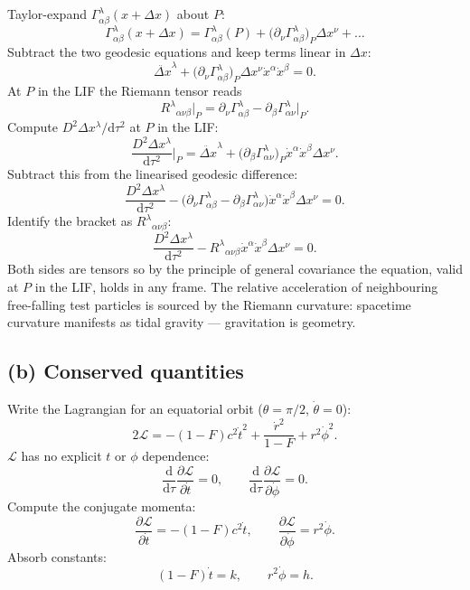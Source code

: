 \documentclass[11pt]{article}
\newcommand{\de}{\mathrm{d}}
\begin{document}
Taylor-expand $\Gamma^{\lambda}_{\alpha\beta}(x+\Delta x)$ about $P$:
\[
\Gamma^{\lambda}_{\alpha\beta}(x+\Delta x)=\Gamma^{\lambda}_{\alpha\beta}(P)+\bigl(\partial_{\nu}\Gamma^{\lambda}_{\alpha\beta}\bigr)_{P}\Delta x^{\nu}+\dots
\]
Subtract the two geodesic equations and keep terms linear in $\Delta x$:
\[
\ddot{\Delta x}^{\lambda}+\bigl(\partial_{\nu}\Gamma^{\lambda}_{\alpha\beta}\bigr)_{P}\Delta x^{\nu}\dot x^{\alpha}\dot x^{\beta}=0.
\]
At $P$ in the LIF the Riemann tensor reads
\[
R^{\lambda}{}_{\alpha\nu\beta}\bigl|_{P}=\partial_{\nu}\Gamma^{\lambda}_{\alpha\beta}-\partial_{\beta}\Gamma^{\lambda}_{\alpha\nu}\bigl|_{P}.
\]
Compute $D^{2}\Delta x^{\lambda}/\de\tau^{2}$ at $P$ in the LIF:
\[
\frac{D^{2}\Delta x^{\lambda}}{\de\tau^{2}}\Big|_{P}=\ddot{\Delta x}^{\lambda}+\bigl(\partial_{\beta}\Gamma^{\lambda}_{\alpha\nu}\bigr)_{P}\dot x^{\alpha}\dot x^{\beta}\Delta x^{\nu}.
\]
Subtract this from the linearised geodesic difference:
\[
\frac{D^{2}\Delta x^{\lambda}}{\de\tau^{2}}-\bigl(\partial_{\nu}\Gamma^{\lambda}_{\alpha\beta}-\partial_{\beta}\Gamma^{\lambda}_{\alpha\nu}\bigr)\dot x^{\alpha}\dot x^{\beta}\Delta x^{\nu}=0.
\]
Identify the bracket as $R^{\lambda}{}_{\alpha\nu\beta}$:
\begin{equation}
\boxed{\;\frac{D^{2}\Delta x^{\lambda}}{\de\tau^{2}}-R^{\lambda}{}_{\alpha\nu\beta}\dot x^{\alpha}\dot x^{\beta}\Delta x^{\nu}=0.\;}
\label{eq:GD}
\end{equation}
Both sides are tensors so by the principle of general covariance the equation, valid at $P$ in the LIF, holds in any frame.  The relative acceleration of neighbouring free-falling test particles is sourced by the Riemann curvature: spacetime curvature manifests as tidal gravity — gravitation is geometry.

\subsection*{(b) Conserved quantities}

Write the Lagrangian for an equatorial orbit ($\theta=\pi/2$, $\dot\theta=0$):
\[
2\mathcal L=-(1-F)c^{2}\dot t^{2}+\frac{\dot r^{2}}{1-F}+r^{2}\dot\phi^{2}.
\]
$\mathcal L$ has no explicit $t$ or $\phi$ dependence:
\[
\frac{\de}{\de\tau}\frac{\partial\mathcal L}{\partial\dot t}=0,\qquad \frac{\de}{\de\tau}\frac{\partial\mathcal L}{\partial\dot\phi}=0.
\]
Compute the conjugate momenta:
\[
\frac{\partial\mathcal L}{\partial\dot t}=-(1-F)c^{2}\dot t,\qquad \frac{\partial\mathcal L}{\partial\dot\phi}=r^{2}\dot\phi.
\]
Absorb constants:
\begin{equation}
\boxed{\;(1-F)\dot t=k,\qquad r^{2}\dot\phi=h.\;}
\label{eq:cons}
\end{equation}
\end{document}
